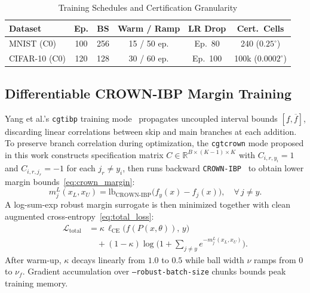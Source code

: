 \documentclass[conference]{IEEEtran}
\begin{document}
\begin{table}[t]
\caption{Training Schedules and Certification Granularity}
\centering
\footnotesize
\setlength{\tabcolsep}{2.4pt}
\renewcommand{\arraystretch}{1.02}
\begin{tabular}{|l|c|c|c|c|c|}
\hline
\textbf{Dataset} & \textbf{Ep.} & \textbf{BS} &
\textbf{Warm / Ramp} & \textbf{LR Drop} & \textbf{Cert.\ Cells} \\
\hline
MNIST (C0) & 100 & 256 & 15 / 50 ep. & Ep.\ 80 & 240 ($0.25^\circ$) \\
\hline
CIFAR-10 (C0) & 120 & 128 & 30 / 60 ep. & Ep.\ 100 & 100k ($0.0002^\circ$) \\
\hline
\end{tabular}
\label{tab:hyperparams}
\end{table}

\subsection{Differentiable CROWN-IBP Margin Training}
Yang et al.'s \texttt{cgtibp} training mode~\cite{b3} propagates uncoupled
interval bounds $[\underline{f}, \overline{f}]$, discarding linear correlations
between skip and main branches at each addition.
To preserve branch correlation during optimization, the \texttt{cgtcrown}
mode proposed in this work constructs specification matrix
$C \in \mathbb{R}^{B \times (K-1) \times K}$ with $C_{i,r,y_i} = 1$ and
$C_{i,r,j_r} = -1$ for each $j_r \neq y_i$, then runs backward
\texttt{CROWN-IBP}~\cite{b11} to obtain lower margin bounds~\eqref{eq:crown_margin}:
\vspace{-3pt}
\begin{equation}
m_j^L(x_L, x_U) =
  \mathrm{lb}_{\text{CROWN-IBP}}\!\big(f_y(x) - f_j(x)\big),\quad
  \forall\, j \neq y.
\label{eq:crown_margin}
\end{equation}
\vspace{-3pt}
A log-sum-exp robust margin surrogate is then minimized together with
clean augmented cross-entropy~\eqref{eq:total_loss}:
\vspace{-3pt}
\begin{equation}
\begin{aligned}
\mathcal{L}_{\mathrm{total}} &=
  \kappa\, \ell_{\mathrm{CE}}\!\big(f(P(x,\theta)),\, y\big) \\
  &\quad + (1 - \kappa)\log\!\bigl(1 + \textstyle\sum_{j \neq y} e^{-m_j^L(x_L, x_U)}\bigr).
\end{aligned}
\label{eq:total_loss}
\end{equation}
\vspace{-3pt}
After warm-up, $\kappa$ decays linearly from $1.0$ to $0.5$ while ball width
$\nu$ ramps from $0$ to $\nu_f$.
Gradient accumulation over \texttt{--robust-batch-size} chunks bounds peak
training memory.
\end{document}
